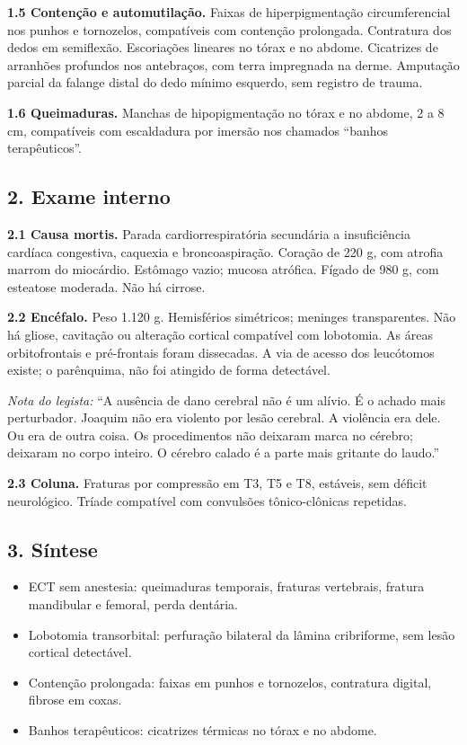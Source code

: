 \noindent \textbf{1.5 Contenção e automutilação.} Faixas de hiperpigmentação circumferencial nos punhos e tornozelos, compatíveis com contenção prolongada. Contratura dos dedos em semiflexão. Escoriações lineares no tórax e no abdome. Cicatrizes de arranhões profundos nos antebraços, com terra impregnada na derme. Amputação parcial da falange distal do dedo mínimo esquerdo, sem registro de trauma.

\noindent \textbf{1.6 Queimaduras.} Manchas de hipopigmentação no tórax e no abdome, 2 a 8 cm, compatíveis com escaldadura por imersão nos chamados ``banhos terapêuticos''.

\subsection*{2. Exame interno}

\noindent \textbf{2.1 Causa mortis.} Parada cardiorrespiratória secundária a insuficiência cardíaca congestiva, caquexia e broncoaspiração. Coração de 220 g, com atrofia marrom do miocárdio. Estômago vazio; mucosa atrófica. Fígado de 980 g, com esteatose moderada. Não há cirrose.

\noindent \textbf{2.2 Encéfalo.} Peso 1.120 g. Hemisférios simétricos; meninges transparentes. Não há gliose, cavitação ou alteração cortical compatível com lobotomia. As áreas orbitofrontais e pré-frontais foram dissecadas. A via de acesso dos leucótomos existe; o parênquima, não foi atingido de forma detectável.

\noindent \textit{Nota do legista:} ``A ausência de dano cerebral não é um alívio. É o achado mais perturbador. Joaquim não era violento por lesão cerebral. A violência era dele. Ou era de outra coisa. Os procedimentos não deixaram marca no cérebro; deixaram no corpo inteiro. O cérebro calado é a parte mais gritante do laudo.''

\noindent \textbf{2.3 Coluna.} Fraturas por compressão em T3, T5 e T8, estáveis, sem déficit neurológico. Tríade compatível com convulsões tônico-clônicas repetidas.

\subsection*{3. Síntese}

\begin{itemize}
\item ECT sem anestesia: queimaduras temporais, fraturas vertebrais, fratura mandibular e femoral, perda dentária.
\item Lobotomia transorbital: perfuração bilateral da lâmina cribriforme, sem lesão cortical detectável.
\item Contenção prolongada: faixas em punhos e tornozelos, contratura digital, fibrose em coxas.
\item Banhos terapêuticos: cicatrizes térmicas no tórax e no abdome.
\end{itemize}

